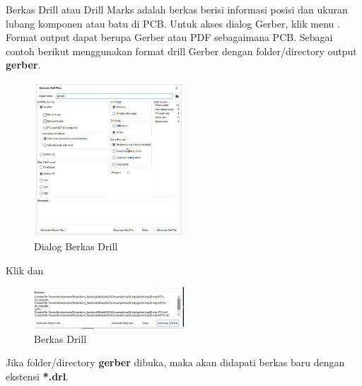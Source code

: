 \documentclass[12pt]{book}
\begin{document}
	Berkas Drill atau Drill Marks adalah berkas berisi informasi posisi dan ukuran lubang komponen atau batu di PCB.
	Untuk akses dialog Gerber, klik menu .
	Format output dapat berupa Gerber atau PDF sebagaimana PCB.
	Sebagai contoh berikut menggunakan format drill Gerber dengan folder/directory output \textbf{gerber}.

	\begin{figure}[!ht]
		\centering
		\includegraphics[width=0.5\textwidth]{images/fab/fab_6}
		\caption{Dialog Berkas Drill}
	\end{figure}

	\newpage
	Klik  dan 

	\begin{figure}[!ht]
		\centering
		\includegraphics[width=0.5\textwidth]{images/fab/fab_7}
		\caption{Berkas Drill}
	\end{figure}

	Jika folder/directory \textbf{gerber} dibuka, maka akan didapati berkas baru dengan ekstensi \textbf{*.drl}.
\end{document}
